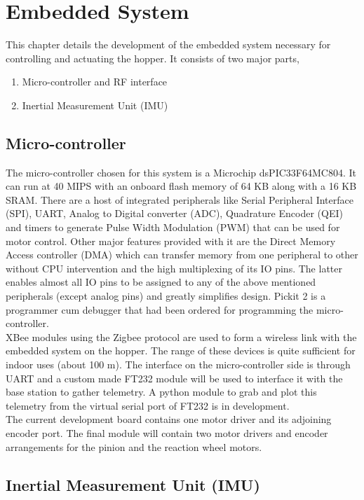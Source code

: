 \chapter{Embedded System}
\label{chap:embedded}
This chapter details the development of the embedded system necessary for controlling and actuating the hopper. It consists of two
major parts,
\begin{enumerate}
\item
Micro-controller and RF interface
\item
Inertial Measurement Unit (IMU)
\end{enumerate}

\section{Micro-controller}
The micro-controller chosen for this system is a Microchip dsPIC33F64MC804. It can run at 40 MIPS with an onboard flash memory of
64 KB along with a 16 KB SRAM. There are a host of integrated peripherals like Serial Peripheral Interface (SPI), UART, Analog to
Digital converter (ADC), Quadrature Encoder (QEI) and timers to generate Pulse Width Modulation (PWM) that can be used for motor
control.
Other major features provided with it are the Direct Memory Access controller (DMA) which can transfer memory from one peripheral
to other without CPU intervention and the high multiplexing of its IO pins. The latter enables almost all IO pins to be assigned
to any of the above mentioned peripherals (except analog pins) and greatly simplifies design. Pickit 2 is a programmer cum
debugger that had been ordered for programming the micro-controller.\\

XBee modules using the Zigbee protocol are used to form a wireless link with the embedded system on the hopper. The range of these
devices is quite sufficient for indoor uses (about 100 m). The interface on the micro-controller side is through UART and a custom
made FT232 module will be used to interface it with the base station to gather telemetry. A python module to grab and plot this 
telemetry from the virtual serial port of FT232 is in development.\\

The current development board contains one motor driver and its adjoining encoder port. The final module will contain two motor
drivers and encoder arrangements for the pinion and the reaction wheel motors.

\section{Inertial Measurement Unit (IMU)}

